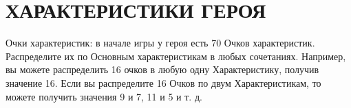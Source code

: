 \section{ХАРАКТЕРИСТИКИ ГЕРОЯ}
Очки характеристик: в начале игры у героя есть 70 Очков характеристик. Распределите их по Основным характеристикам в любых сочетаниях. Например, вы можете распределить 16 очков в любую одну Характеристику, получив значение 16. Если вы распределите 16 Очков по двум Характеристикам, то можете получить значения 9 и 7, 11 и 5 и т. д.